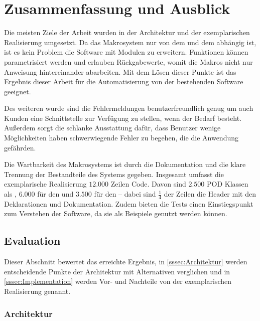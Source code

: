 \section{Zusammenfassung und Ausblick}
\label{sec:Zusammenfassung und Ausblick}
  Die meisten Ziele der Arbeit wurden in der Architektur und der exemplarischen Realisierung umgesetzt. Da das Makrosystem nur von dem  und dem  abhängig ist, ist es kein Problem die Software mit Modulen zu erweitern. Funktionen können parametrisiert werden und erlauben Rückgabewerte, womit die Makros nicht nur Anweisung hintereinander abarbeiten. Mit dem Lösen dieser Punkte ist das Ergebnis dieser Arbeit für die Automatisierung von der bestehenden Software geeignet.

  Des weiteren wurde sind die Fehlermeldungen benutzerfreundlich genug um auch Kunden eine Schnittstelle zur Verfügung zu stellen, wenn der Bedarf besteht. Außerdem sorgt die schlanke Ausstattung dafür, dass Benutzer wenige Möglichkeiten haben schwerwiegende Fehler zu begehen, die die Anwendung gefährden.

  Die Wartbarkeit des Makrosystems ist durch die Dokumentation und die klare Trennung der Bestandteile des Systems gegeben. Insgesamt umfasst die exemplarische Realisierung $12.000$ Zeilen Code. Davon sind $2.500$ POD Klassen als , $6.000$ für den  und $3.500$ für den  -- dabei sind $\frac{1}{4}$ der Zeilen die Header mit den Deklarationen und Dokumentation. Zudem bieten die Tests einen Einstiegspunkt zum Verstehen der Software, da sie als Beispiele genutzt werden können.

\subsection{Evaluation}
\label{ssec:Evaluation}
  Dieser Abschnitt bewertet das erreichte Ergebnis, in \autoref{sssec:Architektur} werden entscheidende Punkte der Architektur mit Alternativen verglichen und in \autoref{sssec:Implementation} werden Vor- und Nachteile von der exemplarischen Realisierung genannt.

  \subsubsection{Architektur}
  \label{sssec:Architektur}
